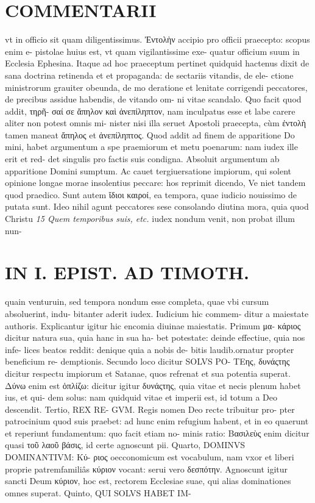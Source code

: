\documentclass{article}
\begin{document}
\begin{pages}
\section*{COMMENTARII }
\marginpar{[ p.164 ]}\pstart vt in officio sit quam diligentissimus. Ἐντολὴν accipio pro officii praecepto: scopus enim e- pistolae huius est, vt quam vigilantissime exe- quatur officium suum in Ecclesia Ephesina. Itaque ad hoc praeceptum pertinet quidquid hactenus dixit de sana doctrina retinenda et et propaganda: de sectariis vitandis, de ele- ctione ministrorum grauiter obeunda, de mo deratione et lenitate corrigendi peccatores, de precibus assidue habendis, de vitando om- ni vitae scandalo. Quo facit quod addit, τηρῆ- σαί σε ἄπηλον καὶ ἀνεπίληπτον, nam inculpatus esse et labe carere aliter non potest omnis mi- nister nisi illa seruet Apostoli praecepta, cùm ἐντολὴ tamen maneat ἄπηλος et ἀνεπίληπτος. Quod addit ad finem de apparitione Do mini, habet argumentum a spe praemiorum et metu poenarum: nam iudex ille erit et red- det singulis pro factis suis condigna. Absoluit argumentum ab apparitione Domini sumptum. Ac cauet tergiuersatione impiorum, qui solent opinione longae morae insolentius peccare: hos reprimit dicendo, Ve niet tandem quod praedico. Sunt autem ἵδιοι καιροί, ea tempora, quae iudicio nouissimo de putata sunt. Ideo nihil agunt peccatores sese consolando diutina mora, quia quod Christu  \pend
\textit{15 Quem temporibus suis, etc. }\pstart iudex nondum venit, non probat illum nun-  \pend
\section*{IN I. EPIST. AD TIMOTH. }
\marginpar{[ p.165 ]}\pstart quain venturuin, sed tempora nondum esse completa, quae vbi cursum absoluerint, indu- bitanter aderit iudex. Iudicium hic commem- ditur a maiestate authoris. Explicantur igitur hic encomia diuinae maiestatis. Primum μα- κάριος dicitur natura sua, quia hanc in sua ha- bet potestate: deinde effectiue, quia nos infe- lices beatos reddit: denique quia a nobis de- bitis laudib.ornatur propter beneficium re- demptionis. Secundo loco dicitur SOLVS PO- ΤEης, δυνάςτης dicitur respectu impiorum et Satanae, quos refrenat et sua potentia superat. Δύνω enim est ὁπλίζω: dicitur igitur δυνάςτης, quia vitae et necis plenum habet ius, et qui- dem solus: nam quidquid vitae et imperii est, id totum a Deo descendit. Tertio, REX RE- GVM. Regis nomen Deo recte tribuitur pro- pter patrocinium quod suis praebet: ad hunc enim refugium habent, et in eo quaerunt et reperiunt fundamentum: quo facit etiam no- minis ratio: Βασιλεὺς enim dicitur quasi τοῦ λαοῦ βάσις, id certe agnoscunt pii.  \pend\pstart Quarto, DOMINVS DOMINANTIVM: Κύ- ριος oecconomicum est vocabulum, nam vxor et liberi proprie patremfamiliâs κύριον vocant: serui vero δεσπότην. Agnoscunt igitur sancti Deum κύριον, hoc est, rectorem Ecclesiae suae, qui alias dominationes omnes superat.  \pend\pstart Quinto, QUI SOLVS HABET IM-  \pend

\end{pages}
\end{document}
